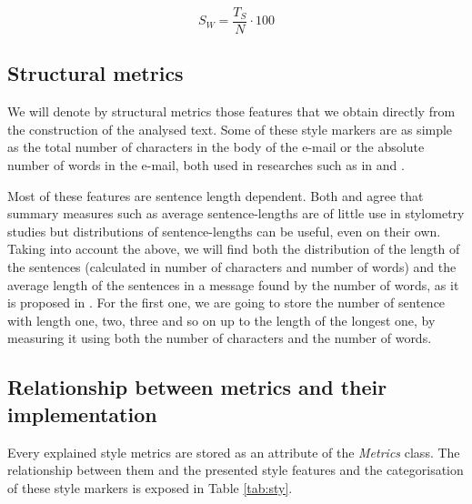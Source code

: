 $$
S_W = \frac{T_S}{N}\cdot 100
$$

\subsection{Structural metrics}\label{ssect:strucf}

We will denote by structural metrics those features that we obtain directly from the construction of the analysed text. Some of these style markers are as simple as the total number of characters in the body of the e-mail or the absolute number of words in the e-mail, both used in researches such as in \cite{corney2001identifying} and \cite{ril2014determination}.

Most of these features are sentence length dependent. Both \cite{tallentire1972appraisal} and \cite{kjetsaa1979and} agree that summary measures such as average sentence-lengths are of little use in stylometry studies but distributions of sentence-lengths can be useful, even on their own. Taking into account the above, we will find both the distribution of the length of the sentences (calculated in number of characters and number of words) and the average length of the sentences in a message found by the number of words, as it is proposed in \cite{corney2001identifying}. For the first one, we are going to store the number of sentence with length one, two, three and so on up to the length of the longest one, by measuring it  using both the number of characters and the number of words.

\subsection{Relationship between metrics and their implementation}\label{ssect:relmet}
Every explained style metrics are stored as an attribute of the \textit{Metrics} class. The relationship between them and the presented style features and the categorisation of these style markers is exposed in Table \ref{tab:sty}.

